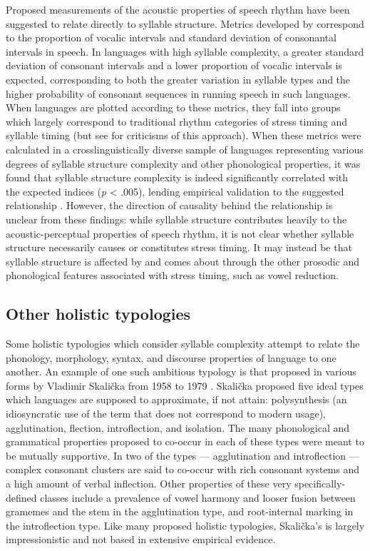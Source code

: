   Proposed measurements of the acoustic properties of speech rhythm have been suggested to relate directly to syllable structure. Metrics developed by \citet{RamusEtAl1999} correspond to the proportion of vocalic intervals and standard deviation of consonantal intervals in speech. In languages with high syllable complexity, a greater standard deviation of consonant intervals and a lower proportion of vocalic intervals is expected, corresponding to both the greater variation in syllable types and the higher probability of consonant sequences in running speech in such languages. When languages are plotted according to these metrics, they fall into groups which largely correspond to traditional rhythm categories of stress timing and syllable timing (but see \citealt{WigetEtAl2010} for criticisms of this approach). When these metrics were calculated in a crosslinguistically diverse sample of languages representing various degrees of syllable structure complexity and other phonological properties, it was found that syllable structure complexity is indeed significantly correlated with the expected indices (\textit{p} < .005), lending empirical validation to the suggested relationship \citep{EasterdayEtAl2011}. However, the direction of causality behind the relationship is unclear from these findings: while syllable structure contributes heavily to the acoustic-perceptual properties of speech rhythm, it is not clear whether syllable structure necessarily causes or constitutes stress timing. It may instead be that syllable structure is affected by and comes about through the other prosodic and phonological features associated with stress timing, such as vowel reduction.

\subsection{Other holistic typologies}\label{sec:1.3.2}

\textsf{} Some holistic typologies which consider syllable complexity attempt to relate the phonology, morphology, syntax, and discourse properties of language to one another. An example of one such ambitious typology is that proposed in various forms by Vladimir Skalička from 1958 to 1979 \citep{Plank1998}. Skalička  proposed five ideal types which languages are supposed to approximate, if not attain: polysynthesis (an idiosyncratic use of the term that does not correspond to modern usage), agglutination, flection, introflection, and isolation. The many phonological and grammatical properties proposed to co-occur in each of these types were meant to be mutually supportive. In two of the types — agglutination and introflection — complex consonant clusters are said to co-occur with rich consonant systems and a high amount of verbal inflection. Other properties of these very specifically-defined classes include a prevalence of vowel harmony and looser fusion between gramemes and the stem in the agglutination type, and root-internal marking in the introflection type. Like many proposed holistic typologies, Skalička’s is largely impressionistic and not based in extensive empirical evidence.

